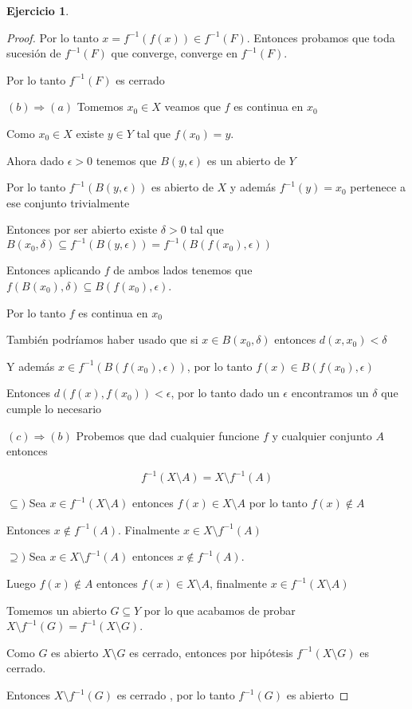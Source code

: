 \documentclass[11pt]{report}
\newcommand{\Ra}{\Rightarrow}
\theoremstyle{definition}
\newtheorem{ej}{Ejercicio}
\begin{document}
\begin{ej}
\begin{enumerate}
\begin{proof}
					Por lo tanto $x = f^{-1}(f(x)) \in f^{-1}(F)$. Entonces probamos que toda sucesión de $f^{-1}(F)$ que converge, converge en $f^{-1}(F)$.

					Por lo tanto $f^{-1}(F) $ es cerrado

					$(b) \Ra (a)$ Tomemos $x_0 \in X$ veamos que $f$ es continua en $x_0$

					Como $x_0 \in X$ existe $y \in Y$ tal que $f(x_0) = y$. 

					Ahora dado $\epsilon >0$ tenemos que $B(y,\epsilon)$ es un abierto de $Y$

					Por lo tanto $f^{-1}(B(y,\epsilon))$ es abierto de $X$ y además $f^{-1}(y) = x_0$ pertenece a ese conjunto trivialmente

					Entonces por ser abierto existe $\delta >0$ tal que $B(x_0,\delta) \subseteq f^{-1}(B(y,\epsilon)) = f^{-1}(B(f(x_0),\epsilon))$

					Entonces aplicando $f$ de ambos lados tenemos que $f(B(x_0),\delta)\subseteq B(f(x_0),\epsilon)$.

					Por lo tanto $f$ es continua en $x_0$

					También podríamos haber usado que si $x\in B(x_0,\delta)$ entonces $d(x,x_0) < \delta$

					Y además $x \in f^{-1}(B(f(x_0),\epsilon))$, por lo tanto $f(x) \in B(f(x_0), \epsilon)$

					Entonces $d(f(x),f(x_0)) < \epsilon$, por lo tanto dado un $\epsilon$ encontramos un $\delta$ que cumple lo necesario

					$(c) \Ra (b)$ Probemos que dad cualquier funcione $f$ y cualquier conjunto $A$ entonces

					$$ f^{-1} (X\setminus A) = X \setminus f^{-1}(A)$$

					$\subseteq ) $ Sea $x \in f^{-1}(X\setminus A)$ entonces $f(x) \in X \setminus A$ por lo tanto $f(x) \notin A$

					Entonces $x \notin f^{-1}(A)$. Finalmente $x \in X \setminus f^{-1}(A)$

					$\supseteq )$ Sea $x \in X \setminus f^{-1}(A)$ entonces $x \notin f^{-1} (A) $.

					Luego $f(x) \notin A$ entonces $f(x) \in X \setminus A$, finalmente $x \in f^{-1}(X \setminus A)$

					Tomemos un abierto $G \subseteq Y$ por lo que acabamos de probar $X \setminus f^{-1}(G) = f^{-1}(X \setminus G)$.

					Como $G$ es abierto $X \setminus G$ es cerrado, entonces por hipótesis $f^{-1}(X \setminus G)$ es cerrado.

					Entonces $X \setminus f^{-1}(G)$ es cerrado , por lo tanto $f^{-1}(G)$ es abierto
				\end{proof}
				
				
		\end{enumerate}
	\end{ej}
	
\end{document}
